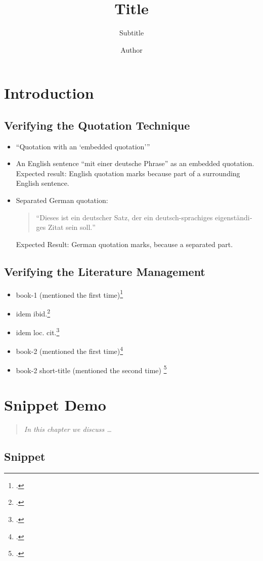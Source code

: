 \documentclass[
  DIV=calc,
  BCOR=5mm,
  11pt,
  headings=small,
  oneside,
  abstract=true,
  toc=bib,
  ngerman,english]{scrbook}
\begin{document}
\nocite{*}

\titlehead{Classification}
\subject{Release }
\title{Title}
\subtitle{Subtitle}
\author{Author}

\maketitle

\chapter{Introduction}

\section{Verifying the Quotation Technique}


\begin{itemize}

  \item \enquote{Quotation with an \enquote{embedded quotation}}

  \item An English sentence \foreignquote{english}{mit einer deutsche Phrase} as an embedded quotation. Expected result: English quotation marks because part of a surrounding English sentence.

  \item Separated German quotation:
  \begin{quote}
    \foreignquote{german}{Dieses ist ein deutscher Satz, der ein deutsch-sprachiges eigenständiges Zitat sein soll.}
  \end{quote}
  Expected Result: German quotation marks, because a separated part.
\end{itemize}

\section{Verifying the Literature Management}
\begin{itemize}
  \item book-1 (mentioned the first time)\footcite[vgl.][15]{KantKdrV1974}
  \item idem ibid.\footcite[vgl.][15]{KantKdrV1974}
  \item idem loc. cit.\footcite[vgl.][23]{KantKdrV1974}
  \item book-2 (mentioned  the first time)\footcite[vgl.][15]{KantKdU1974}
  \item book-2 short-title (mentioned the second time) \footcite[vgl.][15]{KantKdrV1974}
\end{itemize}

\chapter{Snippet Demo}
\begin{quote}\itshape
In this chapter we discuss \ldots
\end{quote}

\section{Snippet}






\printnomenclature
\printbibliography
\end{document}
